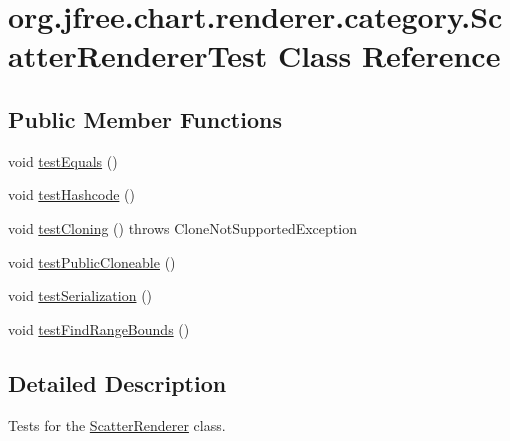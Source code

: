 \hypertarget{classorg_1_1jfree_1_1chart_1_1renderer_1_1category_1_1_scatter_renderer_test}{}\section{org.\+jfree.\+chart.\+renderer.\+category.\+Scatter\+Renderer\+Test Class Reference}
\label{classorg_1_1jfree_1_1chart_1_1renderer_1_1category_1_1_scatter_renderer_test}
\subsection*{Public Member Functions}
\begin{DoxyCompactItemize}
\item 
void \mbox{\hyperlink{classorg_1_1jfree_1_1chart_1_1renderer_1_1category_1_1_scatter_renderer_test_afb41e814afc025e777110e89048cd25d}{test\+Equals}} ()
\item 
void \mbox{\hyperlink{classorg_1_1jfree_1_1chart_1_1renderer_1_1category_1_1_scatter_renderer_test_ab4c67a48fbb2c8ea655fc43e196ffdce}{test\+Hashcode}} ()
\item 
void \mbox{\hyperlink{classorg_1_1jfree_1_1chart_1_1renderer_1_1category_1_1_scatter_renderer_test_a4df736bd577a89570d3c26b9c931d65b}{test\+Cloning}} ()  throws Clone\+Not\+Supported\+Exception 
\item 
void \mbox{\hyperlink{classorg_1_1jfree_1_1chart_1_1renderer_1_1category_1_1_scatter_renderer_test_ab189584557b0aa1c63cf5825dc32920e}{test\+Public\+Cloneable}} ()
\item 
void \mbox{\hyperlink{classorg_1_1jfree_1_1chart_1_1renderer_1_1category_1_1_scatter_renderer_test_a7aa3e719c505525fa8b8c1172336e3ba}{test\+Serialization}} ()
\item 
void \mbox{\hyperlink{classorg_1_1jfree_1_1chart_1_1renderer_1_1category_1_1_scatter_renderer_test_a0041ed01b6bf60cdf9e55fdf05fd32b0}{test\+Find\+Range\+Bounds}} ()
\end{DoxyCompactItemize}


\subsection{Detailed Description}
Tests for the \mbox{\hyperlink{classorg_1_1jfree_1_1chart_1_1renderer_1_1category_1_1_scatter_renderer}{Scatter\+Renderer}} class. 


